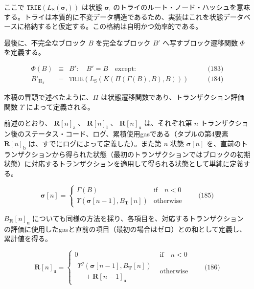\documentclass[
]{ltjsarticle}
\begin{document}
ここで
\(\mathtt{TRIE}(L_{\mathrm{S}}(\boldsymbol{\sigma}_{\mathrm{i}}))\)
は状態 \(\boldsymbol{\sigma}_{\mathrm{i}}\)
のトライのルート・ノード・ハッシュを意味する。トライは本質的に不変データ構造であるため、実装はこれを状態データベースに格納すると仮定する。この格納は自明かつ効率的である。

\hypertarget{Phi}{}

最後に、不完全なブロック \(B\) を完全なブロック \(B'\)
へ写すブロック遷移関数 \(\Phi\) を定義する。

\protect\hypertarget{eq-183}{}{}\protect\hypertarget{eq-184}{}{}

\[\begin{aligned}
\Phi(B) & \equiv & B': \quad B' = B \quad \text{except:} & \qquad \text{(183)} \\
{B'_{\mathrm{H}}}_{\mathrm{r}} & = & \mathtt{TRIE}(L_{\mathrm{S}}(K(\Pi(\Gamma(B), B), B))) & \qquad \text{(184)}
\end{aligned}\]

本稿の冒頭で述べたように、\protect\hyperlink{Pi}{\(\Pi\)}
は状態遷移関数であり、トランザクション評価関数
\protect\hyperlink{Upsilon_state_transition}{\(\Upsilon\)}
によって定義される。

前述のとおり、 \(\mathbf{R}[n]_{\mathrm{z}}\) 、
\(\mathbf{R}[n]_{\mathbf{l}}\) 、 \(\mathbf{R}[n]_{\mathrm{u}}\)
は、それぞれ第 \(n\)
トランザクション後のステータス・コード、ログ、累積使用gasである（タプルの第4要素
\(\mathbf{R}[n]_{\mathrm{b}}\) は、すでにログによって定義した）。また第
\(n\) 状態 \(\boldsymbol{\sigma}[n]\)
を、直前のトランザクションから得られた状態（最初のトランザクションではブロックの初期状態）に対応するトランザクションを適用して得られる状態として単純に定義する。

\protect\hypertarget{eq-185}{}{}\protect\hypertarget{sigma_n}{}{}

\[\boldsymbol{\sigma}[n] = \begin{cases} \Gamma(B) & \text{if} \quad n < 0 \\ \Upsilon(\boldsymbol{\sigma}[n - 1], B_{\mathbf{T}}[n]) & \text{otherwise} \end{cases} \qquad \text{(185)}\]

\(B_{\mathbf{R}}[n]_{\mathrm{u}}\)
についても同様の方法を採り、各項目を、対応するトランザクションの評価に使用したgasと直前の項目（最初の場合はゼロ）との和として定義し、累計値を得る。

\protect\hypertarget{eq-186}{}{}

\[\mathbf{R}[n]_{\mathrm{u}} = \begin{cases} 0 & \text{if} \quad n < 0 \\
\begin{array}{l}
\Upsilon^g(\boldsymbol{\sigma}[n - 1], B_{\mathbf{T}}[n])\\ \quad + \mathbf{R}[n-1]_{\mathrm{u}}
\end{array}
 & \text{otherwise} \end{cases} \qquad \text{(186)}\]
\end{document}
